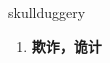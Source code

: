
\begin{frame}
{\huge skullduggery}
\begin{center}
\begin{enumerate}\Large
  \item \textbf{欺诈，诡计}
\end{enumerate}
\end{center}
\end{frame}
